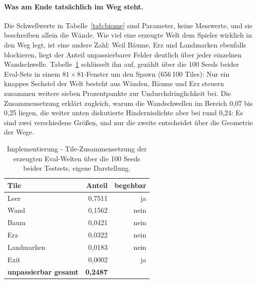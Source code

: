 \documentclass[11pt,a4paper]{article}
\begin{document}
\paragraph{Was am Ende tatsächlich im Weg steht.} Die Schwellwerte in
Tabelle~\ref{tab:biome} sind Parameter, keine Messwerte, und sie beschreiben
allein die Wände. Wie viel eine erzeugte Welt dem Spieler wirklich in den Weg
legt, ist eine andere Zahl: Weil Bäume, Erz und Landmarken ebenfalls
blockieren, liegt der Anteil unpassierbarer Felder deutlich über jeder
einzelnen Wandschwelle. Tabelle~\ref{tab:tilecensus} schlüsselt ihn auf,
gezählt über die 100 Seeds beider Eval-Sets in einem $81\times81$-Fenster um
den Spawn (656\,100 Tiles): Nur ein knappes Sechstel der Welt besteht aus
Wänden, Bäume und Erz steuern zusammen weitere sieben Prozentpunkte zur
Undurchdringlichkeit bei. Die
Zusammensetzung erklärt zugleich, warum die Wandschwellen im Bereich 0,07 bis
0,25 liegen, die weiter unten diskutierte Hindernisdichte aber bei rund 0,24:
Es sind zwei verschiedene Größen, und nur die zweite entscheidet über die
Geometrie der Wege.

\begin{table}[htbp]
\centering
\small
\begin{tabular}{@{}lrr@{}}
\toprule
\textbf{Tile} & \textbf{Anteil} & \textbf{begehbar} \\
\midrule
Leer            & 0,7511 & ja \\
Wand            & 0,1562 & nein \\
Baum            & 0,0421 & nein \\
Erz             & 0,0322 & nein \\
Landmarken      & 0,0183 & nein \\
Exit            & 0,0002 & ja \\
\midrule
\textbf{unpassierbar gesamt} & \textbf{0,2487} & \\
\bottomrule
\end{tabular}
\caption[Tile-Zusammensetzung der Eval-Welten]{Implementierung -
Tile-Zusammensetzung der erzeugten Eval-Welten über die 100 Seeds beider
Testsets, eigene Darstellung.}
\label{tab:tilecensus}
\end{table}
\end{document}
